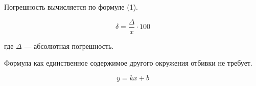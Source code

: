 Погрешность вычисляется по формуле (1).

\begin{equation}
  \delta = \frac{\Delta}{x} \cdot 100
\end{equation}

где $\Delta$ — абсолютная погрешность.

Формула как единственное содержимое другого окружения отбивки не требует.

\begin{minipage}{0.9\textwidth}
\begin{equation*}
  y = kx + b
\end{equation*}
\end{minipage}
